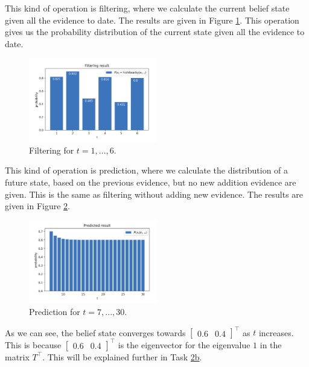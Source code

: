 \documentclass[11pt, a4paper, english]{NTNUoving}
\begin{document}
\begin{oppgave}
\begin{punkt}
    This kind of operation is filtering, where we calculate the current belief state given all the evidence to date.
    The results are given in Figure \ref{fig:filtering}. This operation gives us the probability distribution of the current state given all the evidence to date.
    \begin{figure}[H]
        \centering
        \includegraphics[width=0.5\textwidth]{filtering.png}
        \caption{Filtering for $t = 1,...,6$.}
        \label{fig:filtering}
    \end{figure}

\end{punkt}

\begin{punkt}

    This kind of operation is prediction, where we calculate the distribution of a future state, based on the previous evidence, but no new addition evidence are given.
    This is the same as filtering without adding new evidence. The results are given in Figure \ref{fig:prediction}.
    \begin{figure}[H]
        \centering
        \includegraphics[width=0.5\textwidth]{prediction.png}
        \caption{Prediction for $t = 7,...,30$.}
        \label{fig:prediction}
    \end{figure}
    As we can see, the belief state converges towards $\begin{bmatrix}
        0.6 & 0.4
    \end{bmatrix}^\top$ as $t$ increases. This is because $\begin{bmatrix}
        0.6 & 0.4
    \end{bmatrix}^\top$ is the eigenvector for the eigenvalue $1$ in the matrix $T^\top$. This will be explained further in Task \hyperref[2b]{2b}.
\end{punkt}


\end{oppgave}
\end{document}

